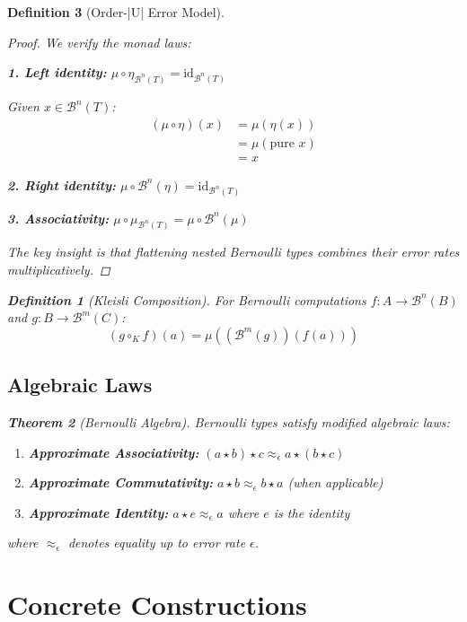 \documentclass[11pt,final,hidelinks]{article}
\newtheorem{theorem}{Theorem}[section]
\newtheorem{definition}[theorem]{Definition}
\begin{document}
\begin{definition}[Order-|U| Error Model]
\begin{proof}
We verify the monad laws:

\textbf{1. Left identity:} $\mu \circ \eta_{\mathcal{B}^n(T)} = \text{id}_{\mathcal{B}^n(T)}$

Given $x \in \mathcal{B}^n(T)$:
\begin{align}
(\mu \circ \eta)(x) &= \mu(\eta(x)) \\
&= \mu(\text{pure } x) \\
&= x
\end{align}

\textbf{2. Right identity:} $\mu \circ \mathcal{B}^n(\eta) = \text{id}_{\mathcal{B}^n(T)}$

\textbf{3. Associativity:} $\mu \circ \mu_{\mathcal{B}^n(T)} = \mu \circ \mathcal{B}^n(\mu)$

The key insight is that flattening nested Bernoulli types combines their error rates multiplicatively.
\end{proof}

\begin{definition}[Kleisli Composition]
For Bernoulli computations $f: A \to \mathcal{B}^n(B)$ and $g: B \to \mathcal{B}^m(C)$:
\begin{equation}
(g \circ_K f)(a) = \mu((\mathcal{B}^m(g))(f(a)))
\end{equation}
\end{definition}

\subsection{Algebraic Laws}

\begin{theorem}[Bernoulli Algebra]
Bernoulli types satisfy modified algebraic laws:
\begin{enumerate}
    \item \textbf{Approximate Associativity:} $(a \star b) \star c \approx_\epsilon a \star (b \star c)$
    \item \textbf{Approximate Commutativity:} $a \star b \approx_\epsilon b \star a$ (when applicable)
    \item \textbf{Approximate Identity:} $a \star e \approx_\epsilon a$ where $e$ is the identity
\end{enumerate}
where $\approx_\epsilon$ denotes equality up to error rate $\epsilon$.
\end{theorem}

\section{Concrete Constructions}


\end{definition}
\end{document}
